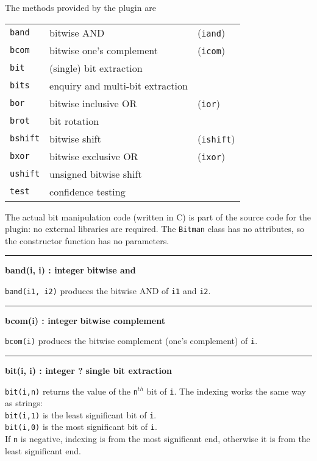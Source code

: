 The methods provided by the plugin are
\begin{center}
\begin{xtabular}{|m{0.5in}|m{2.5in}|m{0.5in}|}
    \hline
    \texttt{band}   & bitwise AND              & (\texttt{iand})\\
    \texttt{bcom}   & bitwise one's complement & (\texttt{icom})\\
    \texttt{bit}    & (single) bit extraction  &\\
    \texttt{bits}   & enquiry and multi-bit extraction &\\
    \texttt{bor}    & bitwise inclusive OR     & (\texttt{ior})\\
    \texttt{brot}   & bit rotation             &\\
    \texttt{bshift} & bitwise shift            & (\texttt{ishift})\\
    \texttt{bxor}   & bitwise exclusive OR     & (\texttt{ixor})\\
    \texttt{ushift} & unsigned bitwise shift   &\\
    \texttt{test}   & confidence testing       &\\
    \hline
\end{xtabular}
\end{center}
The actual bit manipulation code (written in C) is part of the source code for
the plugin: no external libraries are required. The \texttt{Bitman} class has no
attributes, so the constructor function has no parameters.
\bigskip\hrule\vspace{0.1cm}
\noindent
{\bf band(i, i) : integer } \hfill {\bf bitwise and}

\noindent
{}\texttt{band(i1, i2)} produces the bitwise AND of
\texttt{i1} and \texttt{i2}.

\bigskip\hrule\vspace{0.1cm}
\noindent
{\bf bcom(i) : integer } \hfill {\bf bitwise complement}

\noindent
\texttt{bcom(i)} produces the bitwise complement (one's
complement) of \texttt{i}.

\bigskip\hrule\vspace{0.1cm}
\noindent
{\bf bit(i, i) : integer ? } \hfill {\bf single bit extraction}

\noindent
\texttt{bit(i,n)} returns the value of the \texttt{n}$^{th}$
bit of \texttt{i}. The indexing works the same way as strings:\\
\texttt{bit(i,1)} is the least significant bit of \texttt{i}.\\
\texttt{bit(i,0)} is the most significant bit of \texttt{i}.\\
\noindent If \texttt{n} is negative, indexing is from the most significant end,
otherwise it is from the least significant end.

